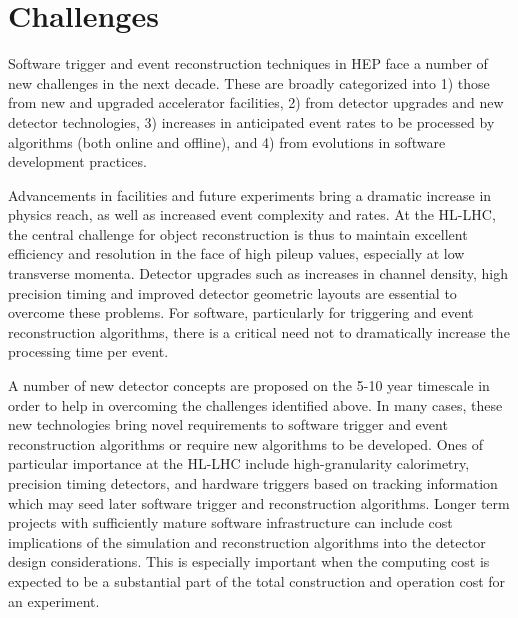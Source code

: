 \section{Challenges}

Software trigger and event reconstruction techniques in HEP face a number of new challenges in the next decade. These are broadly categorized into 1) those from new and upgraded accelerator facilities, 2) from detector upgrades and new detector technologies, 3) increases in anticipated event rates to be processed by algorithms (both online and offline), and 4) from evolutions in software development practices.

Advancements in facilities and future experiments bring a dramatic increase in physics reach, as well as increased event complexity and rates. At the HL-LHC, the central challenge for object reconstruction is thus to maintain excellent efficiency and resolution in the face of high pileup values, especially at low transverse momenta. Detector upgrades such as increases in channel density, high precision timing and improved detector geometric layouts are essential to overcome these problems. For software, particularly for triggering and event reconstruction algorithms, there is a critical need not to dramatically increase the processing time per event.

A number of new detector concepts are proposed on the 5-10 year timescale in order to help in overcoming the challenges identified above. In many cases, these new technologies bring novel requirements to software trigger and event reconstruction algorithms or require new algorithms to be developed. Ones of particular importance at the HL-LHC include high-granularity calorimetry, precision timing detectors, and hardware triggers based on tracking information which may seed later software trigger and reconstruction algorithms. Longer term projects with sufficiently mature software infrastructure can include cost implications of the simulation and reconstruction algorithms into the detector design considerations. This is especially important when the computing cost is expected to be a substantial part of the total construction and operation cost for an experiment. 

